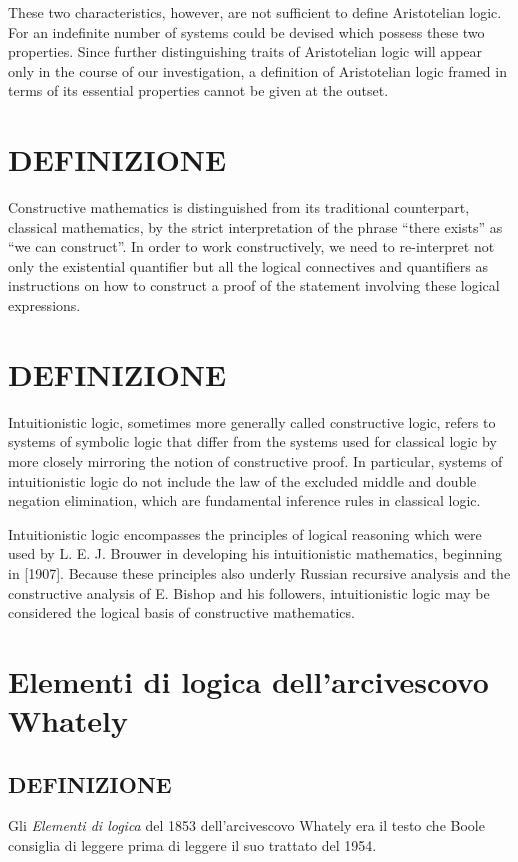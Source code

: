 These two characteristics, however, are not sufficient to define Aristotelian logic. 
For an indefinite number of systems could be devised which possess these two properties. 
Since further distinguishing traits of Aristotelian logic will appear only in the course of our investigation, 
a definition of Aristotelian logic framed in terms of its essential properties cannot be given at the outset.


\section{DEFINIZIONE}
Constructive mathematics is distinguished from its traditional counterpart, classical mathematics, 
by the strict interpretation of the phrase “there exists” as “we can construct”. 
In order to work constructively, we need to re-interpret not only the existential quantifier but all the logical connectives and quantifiers as instructions on how to construct 
a proof of the statement involving these logical expressions. 


\section{DEFINIZIONE}
Intuitionistic logic, sometimes more generally called constructive logic, refers to systems of symbolic logic that differ from the systems used for classical logic 
by more closely mirroring the notion of constructive proof. 
In particular, systems of intuitionistic logic do not include the law of the excluded middle and double negation elimination, 
which are fundamental inference rules in classical logic. \cite{k1}

Intuitionistic logic encompasses the principles of logical reasoning which were used by L. E. J. Brouwer in developing his intuitionistic mathematics, 
beginning in [1907]. Because these principles also underly Russian recursive analysis and the constructive analysis of E. Bishop and his followers, 
intuitionistic logic may be considered the logical basis of constructive mathematics. 



\section{Elementi di logica dell'arcivescovo Whately}


\subsection{DEFINIZIONE}
Gli \textit{Elementi di logica} del 1853 dell'arcivescovo Whately era il testo che Boole consiglia di leggere prima di leggere il suo trattato del 1954.


